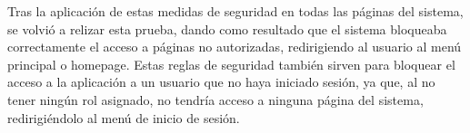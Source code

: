 Tras la aplicación de estas medidas de seguridad en todas las páginas del sistema, se volvió a relizar esta prueba, dando como resultado que el sistema bloqueaba correctamente el acceso a páginas no autorizadas, redirigiendo al usuario al menú principal o homepage.
Estas reglas de seguridad también sirven para bloquear el acceso a la aplicación a un usuario que no haya iniciado sesión, ya que, al no tener ningún rol asignado, no tendría acceso a ninguna página del sistema, redirigiéndolo al menú de inicio de sesión.


